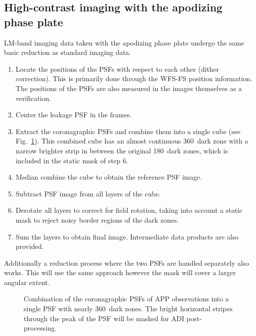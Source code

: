 \subsection{High-contrast imaging with the apodizing phase plate}
\label{ssec:algo_app_imaging}

LM-band imaging data taken with the apodizing phase plate undergo the
same basic reduction as standard imaging data. %



\begin{enumerate}
\item Locate the positions of the PSFs with respect to each other
  (dither correction).
  This is primarily done through the \ac{WFS-FS} position information.
  The positions of the PSFs are also measured in the images themselves as a verification.
\item Center the leakage PSF in the frames.
\item Extract the coronagraphic PSFs and combine them into a single
  cube (see Fig.~\ref{fig:app_psf_combine}). This combined cube has an almost continuous 
  360\degr\ dark zone with a narrow brighter strip in between the original 180\degr\ dark zones, which is included in the static mask of step 6.
\item Median combine the cube to obtain the reference PSF image.
\item Subtract PSF image from all layers of the cube.
\item Derotate all layers to correct for field rotation, taking into
  account a static mask to reject noisy border regions of the dark
  zones.
\item Sum the layers to obtain final image.
  Intermediate data products are also provided.
\end{enumerate}

Additionally a reduction process where the two PSFs are handled separately also works. This will use the same approach however the mask will cover a larger angular extent.

\begin{figure}
  \centering
    \caption[Combination of the coronagraphic PSFs of APP observations into a single PSF]{%
        Combination of the coronagraphic PSFs of APP observations
        into a single PSF with nearly 360\degr\ dark zones. The bright
        horizontal stripes through the peak of the PSF will be masked for
        ADI post-processing.}
  \label{fig:app_psf_combine}
\end{figure}

